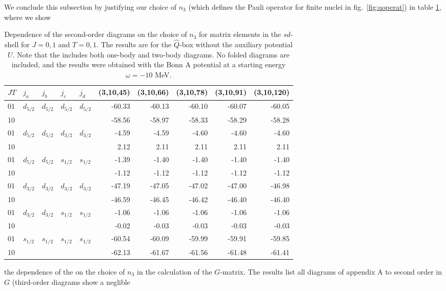 We conclude this subsection by justifying our choice
of $n_3$ (which defines the Pauli operator
for finite nuclei in fig.\ \ref{fig:qoperat})
in table \ref{tab:n32ndconv}, where we show
\begin{table}[hbtp]
\caption{Dependence of the second-order diagrams
on the choice of $n_3$ for
matrix elements in the $sd$-shell for $J=0,1$ and $T=0,1$.
The results are for the $\hat{Q}$-box without the auxiliary
potential $U$.
Note that the \qbox includes both one-body and
two-body diagrams. No folded diagrams are included, and the results
were obtained with the Bonn A potential at a starting energy
$\omega =-10$ MeV.}
\begin{center}
\begin{tabular}{lllllrrrrr}
\\\hline
$JT$&$j_{a}$&$j_{b}$&$j_{c}$&$j_{d}$&
\multicolumn{1}{c}{(3,10,45)}&
\multicolumn{1}{c}{(3,10,66)}&
\multicolumn{1}{c}{(3,10,78)}&
\multicolumn{1}{c}{(3,10,91)}&
\multicolumn{1}{c}{(3,10,120)}
\\\hline
01&$d_{5/2}$&$d_{5/2}$&$d_{5/2}$&$d_{5/2}$&-60.33&-60.13&-60.10&-60.07&-60.05\\
10&&&& &-58.56&-58.97&-58.33&-58.29&-58.28\\
01&$d_{5/2}$&$d_{5/2}$&$d_{3/2}$&$d_{3/2}$&-4.59&-4.59&-4.60&-4.60&-4.60\\
10&&&& &2.12&2.11&2.11&2.11&2.11\\
01&$d_{5/2}$&$d_{5/2}$&$s_{1/2}$&$s_{1/2}$&-1.39&-1.40&-1.40&-1.40&-1.40\\
10&&&& &-1.12&-1.12&-1.12&-1.12&-1.12\\
01&$d_{3/2}$&$d_{3/2}$&$d_{3/2}$&$d_{3/2}$&-47.19&-47.05&-47.02&-47.00&-46.98\\
10&&&& &-46.59&-46.45&-46.42&-46.40&-46.40\\
01&$d_{3/2}$&$d_{3/2}$&$s_{1/2}$&$s_{1/2}$&-1.06&-1.06&-1.06&-1.06&-1.06\\
10&&&& &-0.02&-0.03&-0.03&-0.03&-0.03\\
01&$s_{1/2}$&$s_{1/2}$&$s_{1/2}$&$s_{1/2}$&-60.54&-60.09&-59.99&-59.91&-59.85\\
10&&&& &-62.13&-61.67&-61.56&-61.48&-61.41 \\\hline
\end{tabular}
\end{center}
\label{tab:n32ndconv}
\end{table}
the dependence of the \qbox on the choice of $n_3$ in the
calculation of the $G$-matrix.
The results list all diagrams of appendix A
to second order in $G$ (third-order diagrams show a neglible
